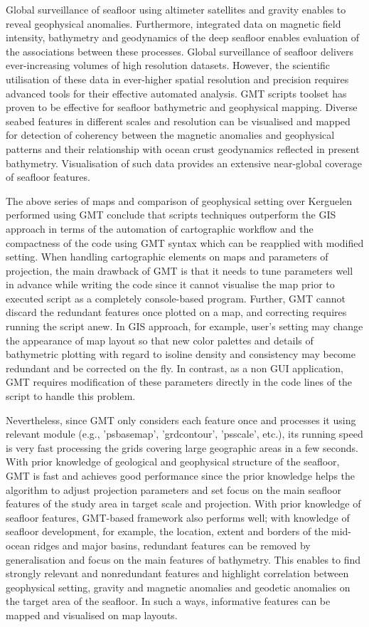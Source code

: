 \documentclass[geomatics,article,submit,pdftex,moreauthors]{Definitions/mdpi}
\begin{document}
Global surveillance of seafloor using altimeter satellites and gravity enables to reveal geophysical anomalies. Furthermore, integrated data on magnetic field intensity, bathymetry and geodynamics of the deep seafloor enables evaluation of the associations between these processes. Global surveillance of seafloor delivers ever-increasing volumes of high resolution datasets. However, the scientific utilisation of these data in ever-higher spatial resolution and precision requires advanced tools  for their effective automated analysis. GMT scripts toolset has proven to be effective for seafloor bathymetric and geophysical mapping. Diverse seabed features in different scales and resolution can be visualised and mapped for detection of coherency between the magnetic anomalies and geophysical patterns and their relationship with ocean crust geodynamics reflected in present bathymetry. Visualisation of such data provides an extensive near-global coverage of seafloor features. 

The above series of maps and comparison of geophysical setting over Kerguelen performed using GMT conclude that scripts techniques outperform the GIS approach in terms of the automation of cartographic workflow and the compactness of the code using GMT syntax which can be reapplied with modified setting. When handling cartographic elements on maps and parameters of projection, the main drawback of GMT is that it needs to tune parameters well in advance while writing the code since it cannot visualise the map prior to executed script as a completely console-based program. Further, GMT cannot discard the redundant features once plotted on a map, and correcting requires running the script anew. In GIS approach, for example, user's setting may change the appearance of map layout so that new color palettes and details of bathymetric plotting with regard to isoline density and consistency may become redundant and be corrected on the fly. In contrast, as a non GUI application, GMT requires modification of these parameters directly in the code lines of the script to handle this problem. 

Nevertheless, since GMT only considers each feature once and processes it using relevant module (e.g., 'psbasemap', 'grdcontour', 'psscale', etc.), its running speed is very fast processing the grids covering large geographic areas in a few seconds. With prior knowledge of geological and geophysical structure of the seafloor, GMT is fast and achieves good performance since the prior knowledge helps the algorithm to adjust projection parameters and set focus on the main seafloor features of the study area in target scale and projection. With prior knowledge of seafloor features, GMT-based framework also performs well; with knowledge of seafloor development, for example, the location, extent and borders of the mid-ocean ridges and major basins, redundant features can be removed by generalisation and focus on the main features of bathymetry. This enables to find strongly relevant and nonredundant features and highlight correlation between geophysical setting, gravity and magnetic anomalies and geodetic anomalies on the target area of the seafloor. In such a ways, informative features can be mapped and visualised on map layouts. 
\end{document}
